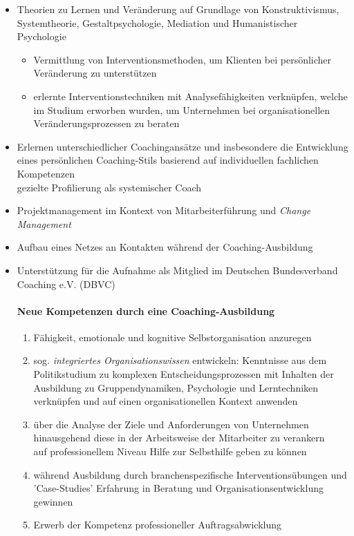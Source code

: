 \documentclass[11pt,a4paper]{article}
\begin{document}
\begin{itemize}

\item Theorien zu Lernen und Veränderung auf Grundlage von Konstruktivismus, Systemtheorie, Gestaltpsychologie, Mediation und Humanistischer Psychologie

	\begin{itemize}
		\item Vermittlung von Interventionsmethoden, um Klienten bei persönlicher Veränderung zu unterstützen
		\item erlernte Interventionstechniken mit Analysefähigkeiten verknüpfen, welche im Studium erworben wurden, um Unternehmen bei organisationellen Veränderungsprozessen zu beraten
	\end{itemize}


\item Erlernen unterschiedlicher Coachingansätze und insbesondere die Entwicklung eines persönlichen Coaching-Stils basierend auf individuellen fachlichen Kompetenzen\\
 gezielte Profilierung als systemischer Coach

\item Projektmanagement im Kontext von Mitarbeiterführung und \textsl{Change Management}

\item Aufbau eines Netzes an Kontakten während der Coaching-Ausbildung

\item Unterstützung für die Aufnahme als Mitglied im Deutschen Bundesverband Coaching e.V. (DBVC)


\paragraph*{\textsf{Neue Kompetenzen durch eine Coaching-Ausbildung}}

\begin{enumerate}
\item Fähigkeit, emotionale und kognitive Selbstorganisation anzuregen
\item sog. \textsl{integriertes Organisationswissen} entwickeln: Kenntnisse aus dem Politikstudium zu komplexen Entscheidungsprozessen mit Inhalten der Ausbildung zu Gruppendynamiken, Psychologie und Lerntechniken verknüpfen und auf einen organisationellen Kontext anwenden
\item über die Analyse der Ziele und Anforderungen von Unternehmen hinausgehend diese in der Arbeitsweise der Mitarbeiter zu verankern\\
 auf professionellem Niveau Hilfe zur Selbsthilfe geben zu können
\item während Ausbildung durch branchenspezifische Interventionsübungen und 'Case-Studies' Erfahrung in Beratung und Organisationsentwicklung gewinnen
\item Erwerb der Kompetenz professioneller Auftragsabwicklung
\end{enumerate}

\end{itemize}
\end{document}
